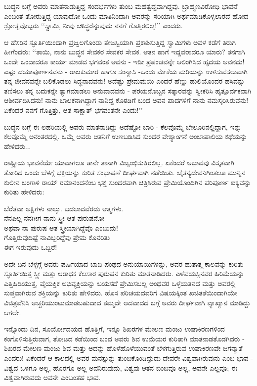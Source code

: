  ಬುದ್ಧನ ಬಗ್ಗೆ ಅವರು ಮಾತನಾಡುತ್ತಿದ್ದ ಸಂದರ್ಭಗಳು ತುಂಬ ಮಹತ್ವದ್ದವಾಗಿದ್ದವು. ಬ್ರಾಹ್ಮಣವಿರೋಧಿ ಭಾವನೆ ಎಂಬಂತೆ ತೋರುತ್ತಿದ್ದ ಯಾವುದೋ ಒಂದು ಮಾತಿನಿಂದಾಗಿ ಅವರನ್ನು ಸರಿಯಾಗಿ ಅರ್ಥಮಾಡಿಕೊಳ್ಳಲಾರದೆ ಹೋದ ಶ್ರೋತೃವೊಬ್ಬರು ‘‘ಸ್ವಾಮಿ, ನೀವು ಬೌದ್ಧರೆನ್ನುವುದು ನನಗೆ ಗೊತ್ತಿರಲಿಲ್ಲ!’’ ಎಂದರು.

ಆ ಹೆಸರಿನ ಸ್ಫೂರ್ತಿಯಿಂದಾಗಿ ಪ್ರಜ್ವಲಗೊಂಡು ತೇಜಸ್ವಿಯಾಗಿ ಪ್ರಕಾಶಿಸುತ್ತಿದ್ದ ಸ್ವಾಮಿಗಳು ಅವಳ ಕಡೆಗೆ ತಿರುಗಿ ಹೀಗೆಂದರು: ‘‘ತಾಯಿ, ನಾನು ಬುದ್ಧನ ಸೇವಕರ ಸೇವಕರ ಸೇವಕ. ಆತನ ಹಾಗೆ ಇದ್ದವರಾದರೂ ಯಾರು? ತನಗಾಗಿ ಒಂದೇ ಒಂದಾದರೂ ಕಾರ್ಯ ಮಾಡದ ಭಗವಂತ ಅವನು - ಇಡೀ ಪ್ರಪಂಚವನ್ನೇ ಆಲಿಂಗಿಸಿದ ಹೃದಯ ಅವನದು! ಎಷ್ಟು ದಯಾಪೂರ್ಣನವನು - ರಾಜಕುಮಾರ ಹಾಗೂ ಸಂನ್ಯಾಸಿ -ಒಂದು ಮೇಕೆಯ ಮರಿಯನ್ನು ಉಳಿಸುವಸಲುವಾಗಿ ತನ್ನ ಜೀವನವನ್ನೇ ಬಲಿಕೊಡಲು ಸಿದ್ಧನಾದವನು! ಅದೆಷ್ಟು ಪ್ರೇಮಮಯಿ ಎಂದರೆ ಹೆಣ್ಣು ಹುಲಿಯೊಂದರ ಹಸಿವನ್ನು ತಣಿಸಲು ತನ್ನ ಬದುಕನ್ನೇ ತ್ಯಾಗಮಾಡಲು ಅನುವಾದವನು - ಪರಯನೊಬ್ಬನ ಸತ್ಕಾರವನ್ನು ಸ್ವೀಕರಿಸಿ ಹೃತ್ಪೂರ್ವಕವಾಗಿ ಆಶೀರ್ವದಿಸಿದನು! ನಾನು ಬಾಲಕನಾಗಿದ್ದಾಗ ನಾನಿದ್ದ ಕೊಠಡಿಗೆ ಬಂದ ಅವನ ಪಾದಗಳಿಗೆ ನಾನು ನಮಸ್ಕರಿಸಿರುವೆನು! ಏಕೆಂದರೆ ನನಗೆ ಗೊತ್ತಿತ್ತು, ಆತ ಸಾಕ್ಷಾತ್ ಭಗವಂತನೇ ಎಂದು!’’

ಬುದ್ಧನ ಬಗ್ಗೆ ಈ ಲಹರಿಯಲ್ಲಿ ಅವರು ಮಾತನಾಡಿದ್ದು ಅದೆಷ್ಟೋ ಬಾರಿ - ಕೆಲವೊಮ್ಮೆ ಬೇಲೂರಿನಲ್ಲಿದ್ದಾಗ, ಇನ್ನು ಕೆಲವೊಮ್ಮೆ ಅನಂತರದಲ್ಲಿ. ಒಮ್ಮೆ ಅವರು ಆತನಿಗೆ ಉಣಬಡಿಸಿದ ಸುಂದರ ವೇಶ್ಯಾಂಗನೆ ಅಂಬಾಪಾಲಿಯ ಕಥೆಯನ್ನು ಹೇಳಿದರು...

ರಾಷ್ಟ್ರೀಯ ಭಾವನೆಯೇ ಯಾವಾಗಲೂ ತಾನೇ ತಾನಾಗಿ ವಿಜೃಂಭಿಸುತ್ತಿರಲಿಲ್ಲ. ಏಕೆಂದರೆ ಅಭಾವವು ವಿಸ್ತೃತವಾಗಿ ತೋರಿದ ಒಂದು ಬೆಳಗ್ಗೆ ಭಕ್ತಿಯನ್ನು ಕುರಿತ ಸಂಭಾಷಣೆ ದೀರ್ಘವಾಗಿ ನಡೆಯಿತು. ಚೈತನ್ಯದೇವನಿಗಿಂತಲೂ ಮುನ್ನಿನ ಕುಲೀನ ಬಂಗಾಳಿ ರಾಯ್​ ರಮಾನಂದನೆಂಬ ಭಕ್ತ ಸುಂದರವಾಗಿ ಚಿತ್ರಿಸಿರುವ ಪ್ರೇಮಿಯೊಂದಿಗಿನ ಪರಿಪೂರ್ಣ ಐಕ್ಯವನ್ನು ಕುರಿತು ಹೇಳಿದರು:

\begin{myquote}
ಬೆರೆತವಾ ಅಕ್ಷಿಗಳು ನಾಲ್ಕು. ಬದಲಾದವೆರಡು ಆತ್ಮಗಳು.\\ನೆನಪಿಲ್ಲ ನನಗೀಗ ನಾನು ಸ್ತ್ರೀ ಆತ ಪುರುಷನೋ\\ಅಥವಾ ನಾ ಪುರುಷ ಆತ ಸ್ತ್ರೀಯಾಗಿದ್ದೆವೊ ಎಂಬುದು!\\ಗೊತ್ತಿರುವುದಿಷ್ಟೆ ನಾವಿಬ್ಬರಿದ್ದೆವು ಪ್ರೇಮ ಕೊನರಿತು\\ಈಗ ಇರುವುದು ಒಬ್ಬರೆ!
\end{myquote}

ಅದೇ ದಿನ ಬೆಳ್ಳಗ್ಗೆ ಅವರು ಪರ್ಷಿಯಾದ ಬಾಬಿ ಪಂಥದ ಅನುಯಾಯಿಗಳನ್ನು, ಅವರ ಹುತಾತ್ಮ ಕಾಲವನ್ನು ಕುರಿತು ಸ್ಫೂರ್ತಿಯಿತ್ತ ಸ್ತ್ರೀ ಮತ್ತು ಆರಾಧಕ ಕೆಲಸಾರ ಪುರುಷನ ಕುರಿತು ಮಾತನಾಡಿದರು. ಎಳೆವಯಸ್ಸಿನವರ ಹಿರಿಮೆಯನ್ನು ಎತ್ತಿಹಿಡಿಯುತ್ತ, ವೈಯಕ್ತಿಕ ಅಭಿವ್ಯಕ್ತಿಯನ್ನು ಬಯಸದೆ ಪ್ರೇಮಿಸಬಲ್ಲ ಅಂಥವರ ಒಳ್ಳೆಯತನದ ಮತ್ತು ಅವರಲ್ಲಿ ಸುಪ್ತವಾಗಿರುವ ಶಕ್ತಿಯನ್ನು ಕುರಿತು ಹೇಳಿದರು. ಹೊಸ ಪರಿಚಯದವರಿಗೆ ವಿಷಯಕ್ಕಿಂತ ಖಚಿತತೆಯಿಂದಾಗಿಯೇ ವಿಚಿತ್ರವೆನಿಸಿ ಅಚ್ಚರಿಯುಂಟುಮಾಡಬಹುದಾದ ತಮ್ಮದೇ ಆದವಾದದ ಬಗ್ಗೆ ಅವರು ದೀರ್ಘವಾಗಿ ವ್ಯಾಖ್ಯಾನ ಮಾಡಿದ್ದು ಆಗಲೇ.

ಇನ್ನೊಂದು ದಿನ, ಸೂರ್ಯೋದಯದ ಹೊತ್ತಿಗೆ, ಇನ್ನೂ ಶಿಖರಗಳ ಮೇಲಣ ಮಂಜು ಉಷಾಕಿರಣಗಳಿಂದ ಕಂಗೊಳಿಸುತ್ತಿರುವಾಗ, ತೋಟದ ಕಡೆಯಿಂದ ಬಂದ ಅವರು ಶಿವ ಉಮೆಯರ ಕುರಿತಾಗಿ ಮಾತನಾಡತೊಡಗಿದರು - ಶಿಖರದ ಮೇಲಣ ಮಂಜು ಶಿವ ಮತ್ತು ಅದನ್ನು ಹೊಳೆಹೊಳೆಯುವಂತೆ ಬೆಳಗುತ್ತಿರುವ ಉಷಾಕಿರಣವೇ ಜಗನ್ಮಾತೆ ಎಂದರು! ಏಕೆಂದರೆ ಆ ಕಾಲದಲ್ಲಿ ಅವರ ಮನಸ್ಸುನ್ನು ತುಂಬಿಕೊಂಡಿದ್ದುದು ದೇವರೇ ವಿಶ್ವವಾಗಿರುವುನು ಎಂಬ ಭಾವ - ವಿಶ್ವದ ಒಳಗೂ ಅಲ್ಲ, ಹೊರಗೂ ಅಲ್ಲ ಅವನಿರುವುದು, ವಿಶ್ವವು ಆತನ ಬಿಂಬವೂ ಅಲ್ಲ, ಅವನೇ ಎಲ್ಲವೂ; ಈ ವಿಶ್ವವಾಗಿರುವದು ಅವನೇ ಎಂಬಂತಹ ಭಾವ.

